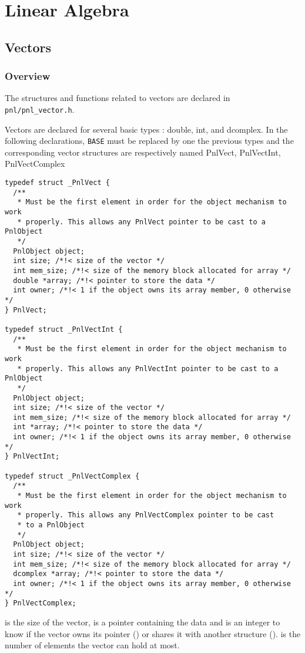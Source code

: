   \section{Linear Algebra}

\subsection{Vectors}
\subsubsection{Overview}

The structures and functions related to vectors are declared in
\verb!pnl/pnl_vector.h!.


Vectors are declared for several basic types : double, int, and
dcomplex. In the following declarations, {\tt BASE} must be replaced by one
the previous types and the corresponding vector structures are respectively
named PnlVect, PnlVectInt, PnlVectComplex
\begin{verbatim}
typedef struct _PnlVect {
  /**
   * Must be the first element in order for the object mechanism to work
   * properly. This allows any PnlVect pointer to be cast to a PnlObject
   */
  PnlObject object; 
  int size; /*!< size of the vector */
  int mem_size; /*!< size of the memory block allocated for array */
  double *array; /*!< pointer to store the data */
  int owner; /*!< 1 if the object owns its array member, 0 otherwise */
} PnlVect;

typedef struct _PnlVectInt {
  /**
   * Must be the first element in order for the object mechanism to work
   * properly. This allows any PnlVectInt pointer to be cast to a PnlObject
   */
  PnlObject object; 
  int size; /*!< size of the vector */ 
  int mem_size; /*!< size of the memory block allocated for array */
  int *array; /*!< pointer to store the data */
  int owner; /*!< 1 if the object owns its array member, 0 otherwise */
} PnlVectInt;

typedef struct _PnlVectComplex {
  /**
   * Must be the first element in order for the object mechanism to work
   * properly. This allows any PnlVectComplex pointer to be cast 
   * to a PnlObject
   */
  PnlObject object; 
  int size; /*!< size of the vector */ 
  int mem_size; /*!< size of the memory block allocated for array */
  dcomplex *array; /*!< pointer to store the data */
  int owner; /*!< 1 if the object owns its array member, 0 otherwise */
} PnlVectComplex;
\end{verbatim}
 is the size of the vector,  is a pointer containing the
data and  is an integer to know if the vector owns its 
pointer () or shares it with another structure ().
 is the number of elements the vector can hold at most.

